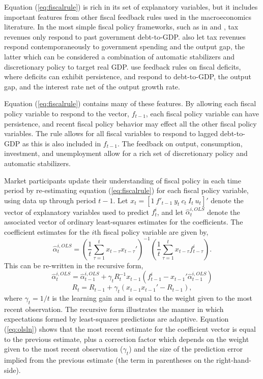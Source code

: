 \documentclass[11pt]{article}
\newcommand{\beq}{\begin{equation}}
\newcommand{\eeq}{\end{equation}}
\newcommand{\citee}[1]{\citet{#1}}
\begin{document}
Equation (\ref{eq:fiscalrule}) is rich in its set of explanatory variables, but it includes important features from other fiscal feedback rules used in the macroeconomics literature.  In the most simple fiscal policy frameworks, such as in \citee{SchmittGrohe2007} and \cite{ChungDavigLeeper2007}, tax revenues only respond to past government debt-to-GDP.  \citee{DavigLeeper2006} also let tax revenues respond contemporaneously to government spending and the output gap, the latter which can be considered a combination of automatic stabilizers and discretionary policy to target real GDP.  \citee{Favero2003} use feedback rules on fiscal deficits, where deficits can exhibit persistence, and respond to debt-to-GDP, the output gap, and the interest rate net of the output growth rate.  

Equation (\ref{eq:fiscalrule}) contains many of these features.  By allowing each fiscal policy variable to respond to the vector, $f_{t-1}$, each fiscal policy variable can have persistence, and recent fiscal policy behavior may effect all the other fiscal policy variables.  The rule allows for all fiscal variables to respond to lagged debt-to-GDP as this is also included in $f_{t-1}$.  The feedback on output, consumption, investment, and unemployment allow for a rich set of discretionary policy and automatic stabilizers.

Market participants update their understanding of fiscal policy in each time period by re-estimating equation (\ref{eq:fiscalrule}) for each fiscal policy variable, using data up through period $t-1$.  Let $x_{t} = [1~ f'_{t-1}~ y_t~ c_t~ I_t~ u_t]'$ denote the vector of explanatory variables used to predict $f^i_{t}$, and let $\hat{\alpha}^{i,OLS}_{t}$ denote the associated vector of ordinary least-squares estimates for the coefficients.  The coefficient estimates for the $i$th fiscal policy variable are given by,
\beq \hat{\alpha}^{i,OLS}_{t} = \left( \frac{1}{t} \sum_{\tau=1}^{t} x_{t-\tau} x_{t-\tau}' \right)^{-1}  \left( \frac{1}{t} \sum_{\tau=1}^{t} x_{t-\tau}  f^i_{t-\tau} \right). \eeq
This can be re-written in the recursive form,
\beq \label{eq:olsln} \hat{\alpha}^{i,OLS}_t = \hat{\alpha}^{i,OLS}_{t-1} + \gamma_t  R_t^{-1} x_{t-1} \left(f^i_{t-1} - x_{t-1}'\hat{\alpha}^{i,OLS}_{t-1}\right) \eeq
\beq \label{eq:olslnR} R_t = R_{t-1} + \gamma_t \left(x_{t-1} x_{t-1}' - R_{t-1}\right), \eeq
where $\gamma_{t} = 1/t$ is the learning gain and is equal to the weight given to the most recent observation.  The recursive form illustrates the manner in which expectations formed by least-squares predictions are adaptive.  Equation (\ref{eq:olsln}) shows that the most recent estimate for the coefficient vector is equal to the previous estimate, plus a correction factor which depends on the weight given to the most recent observation ($\gamma_t$) and the size of the prediction error implied from the previous estimate (the term in parentheses on the right-hand-side).  
\end{document}
